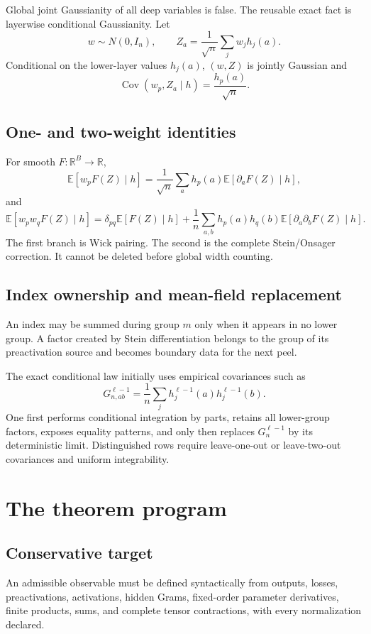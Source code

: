 \documentclass[9pt,oneside]{extreport}
\begin{document}
Global joint Gaussianity of all deep variables is false.  The reusable exact
fact is layerwise conditional Gaussianity.  Let
\[
w\sim N(0,I_n),\qquad
Z_a=\frac1{\sqrt n}\sum_jw_jh_j(a).
\]
Conditional on the lower-layer values $h_j(a)$, $(w,Z)$ is jointly Gaussian
and
\[
\operatorname{Cov}(w_p,Z_a\mid h)
=\frac{h_p(a)}{\sqrt n}.
\]

\section{One- and two-weight identities}

For smooth $F:\mathbb R^B\to\mathbb R$,
\[
\mathbb E[w_pF(Z)\mid h]
=
\frac1{\sqrt n}\sum_a h_p(a)
\mathbb E[\partial_aF(Z)\mid h],
\]
and
\[
\mathbb E[w_pw_qF(Z)\mid h]
=
\delta_{pq}\mathbb E[F(Z)\mid h]
+
\frac1n\sum_{a,b}h_p(a)h_q(b)
\mathbb E[\partial_a\partial_bF(Z)\mid h].
\]
The first branch is Wick pairing.  The second is the complete Stein/Onsager
correction.  It cannot be deleted before global width counting.

\section{Index ownership and mean-field replacement}

An index may be summed during group $m$ only when it appears in no lower
group.  A factor created by Stein differentiation belongs to the group of its
preactivation source and becomes boundary data for the next peel.

The exact conditional law initially uses empirical covariances such as
\[
G_{n,ab}^{\ell-1}
=\frac1n\sum_jh_j^{\ell-1}(a)h_j^{\ell-1}(b).
\]
One first performs conditional integration by parts, retains all lower-group
factors, exposes equality patterns, and only then replaces $G_n^{\ell-1}$ by
its deterministic limit.  Distinguished rows require leave-one-out or
leave-two-out covariances and uniform integrability.

\chapter{The theorem program}

\section{Conservative target}

An admissible observable must be defined syntactically from outputs, losses,
preactivations, activations, hidden Grams, fixed-order parameter derivatives,
finite products, sums, and complete tensor contractions, with every
normalization declared.
\end{document}
